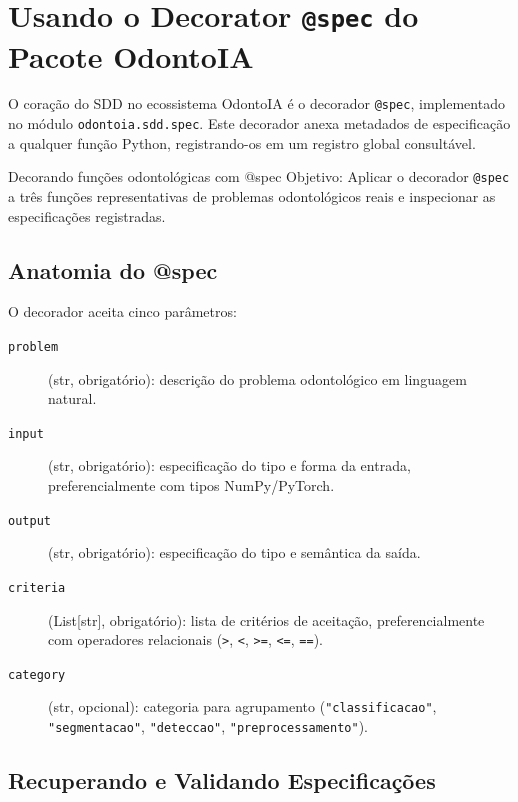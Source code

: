 
\section{Usando o Decorator \texttt{@spec} do Pacote OdontoIA}

O coração do SDD no ecossistema OdontoIA é o decorador \texttt{@spec},
implementado no módulo \texttt{odontoia.sdd.spec}. Este decorador anexa
metadados de especificação a qualquer função Python, registrando-os em
um registro global consultável.

\begin{pratica}{Decorando funções odontológicas com @spec}
  Objetivo: Aplicar o decorador \texttt{@spec} a três funções
  representativas de problemas odontológicos reais e inspecionar
  as especificações registradas.
\end{pratica}


\subsection{Anatomia do @spec}

O decorador aceita cinco parâmetros:

\begin{description}
  \item[\texttt{problem}] (str, obrigatório): descrição do problema
    odontológico em linguagem natural.
  \item[\texttt{input}] (str, obrigatório): especificação do tipo e
    forma da entrada, preferencialmente com tipos NumPy/PyTorch.
  \item[\texttt{output}] (str, obrigatório): especificação do tipo e
    semântica da saída.
  \item[\texttt{criteria}] (List[str], obrigatório): lista de critérios
    de aceitação, preferencialmente com operadores relacionais
    (\texttt{>}, \texttt{<}, \texttt{>=}, \texttt{<=}, \texttt{==}).
  \item[\texttt{category}] (str, opcional): categoria para agrupamento
    (\texttt{"classificacao"}, \texttt{"segmentacao"},
    \texttt{"deteccao"}, \texttt{"preprocessamento"}).
\end{description}

\subsection{Recuperando e Validando Especificações}

